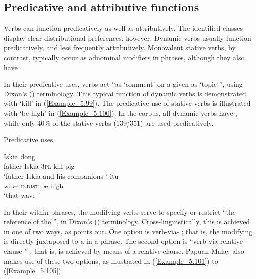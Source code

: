 \subsection{Predicative and attributive functions}
\label{Para_5.3.2}
Verbs can function predicatively as well as attributively. The identified  classes display clear distributional preferences, however. Dynamic verbs usually function predicatively, and less frequently attributively. Monovalent stative verbs, by contrast, typically occur as adnominal modifiers in  phrases, although they also have .



In their predicative uses, verbs act “as ‘comment’ on a given  as ‘topic’”, using Dixon’s (\citeyear*[31]{Dixon.1994}) terminology. This typical function of dynamic verbs is demonstrated with   ‘kill’ in (\ref{Example_5.99}). The predicative use of  stative verbs is illustrated with  ‘be high’ in (\ref{Example_5.100}). In the corpus, all dynamic verbs have , while only 40\% of the stative verbs (139/351) are used predicatively.


\begin{styleExampleTitle}
Predicative uses
\end{styleExampleTitle}

\ea
\label{Example_5.99}
 {Iskia} {dong} {} {}\\ %
 father  Iskia  \textsc{3pl}  kill  pig\\
\glt 
‘father Iskia and his companions ’ \textstyleExampleSource{[080917-008-NP.0120]}
\z
\ea
\label{Example_5.100}
 {itu} {}\\ %
 wave  \textsc{d.dist}  be.high\\
\glt 
‘that wave ’ \textstyleExampleSource{[080923-015-CvEx.0016]}
\z


In their  within  phrases, the modifying verbs serve to specify or restrict “the reference of the ”, in Dixon’s (\citeyear*[31]{Dixon.1994}) terminology. Cross-linguistically, this is achieved in one of two ways, as \citet{Dixon.1994} points out. One option is verb-via- ; that is, the modifying  is directly juxtaposed to a  in a  phrase. The second option is “verb-via-relative-clause ” {\citep[19]{Dixon.2004b}; that is,  is achieved by means of a relative clause. }Papuan Malay also makes use of these two options, as illustrated in (\ref{Example_5.101}) to (\ref{Example_5.105})



